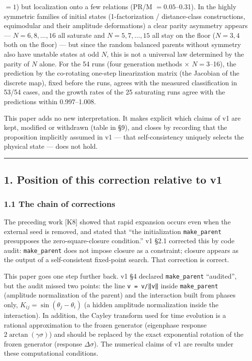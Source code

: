 \documentclass[
  10pt,
  a4paper,
]{article}
\begin{document}
\begin{enumerate}
  \(=1\)) but localization onto a few relations (PR/M \(=0.05\)--0.31).
  In the highly symmetric families of initial states (1-factorization /
  distance-class constructions, equimodular and their amplitude
  deformations) a clear parity asymmetry appears --- \(N=6,8,\dots,16\)
  all saturate and \(N=5,7,\dots,15\) all stay on the floor (\(N=3,4\)
  both on the floor) --- but since the random balanced parents without
  symmetry also have unstable states at odd \(N\), this is not a
  universal law determined by the parity of \(N\) alone. For the 54 runs
  (four generation methods × \(N=3\)--16), the prediction by the
  co-rotating one-step linearization matrix (the Jacobian of the
  discrete map), fixed before the runs, agrees with the measured
  classification in 53/54 cases, and the growth rates of the 25
  saturating runs agree with the predictions within 0.997--1.008.
\end{enumerate}

This paper adds no new interpretation. It makes explicit which claims of
v1 are kept, modified or withdrawn (table in §9), and closes by
recording that the proposition implicitly assumed in v1 --- that
self-consistency uniquely selects the physical state --- does not hold.

\begin{center}\rule{0.5\linewidth}{0.5pt}\end{center}

\subsection{1. Position of this correction relative to
v1}\label{position-of-this-correction-relative-to-v1}

\subsubsection{1.1 The chain of
corrections}\label{the-chain-of-corrections}

The preceding work {[}K8{]} showed that rapid expansion occurs even when
the external seed is removed, and stated that ``the initialization
\texttt{make\_parent} presupposes the zero-square-closure condition.''
v1 §2.1 corrected this by code audit: \texttt{make\_parent} does not
impose closure as a constraint; closure appears as the output of a
self-consistent fixed-point search. That correction is correct.

This paper goes one step further back. v1 §4 declared
\texttt{make\_parent} ``audited'', but the audit missed two points: the
line \texttt{v\ =\ v/‖v‖} inside \texttt{make\_parent} (amplitude
normalization of the parent) and the interaction built from phases only,
\(K_{ij}=\sin(\theta_j-\theta_i)\) (a hidden amplitude normalization
inside the interaction). In addition, the Cayley transform used for time
evolution is a rational approximation to the frozen generator
(eigenphase response \(2\arctan(\gamma\sigma)\)) and should be replaced
by the exact exponential rotation of the frozen generator (response
\(\Delta\sigma\)). The numerical claims of v1 are results under these
computational conditions.
\end{document}

